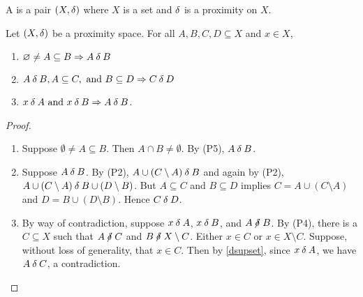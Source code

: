 \begin{definition}
	A  is a pair \( (X,\mathord{\delta}) \) where \( X \) is a set and \( \mathord{\delta} \) is a proximity on \( X \).
\end{definition}

\begin{proposition}
	\label{dprops}
	Let \( (X,\mathord{\delta}) \) be a proximity space.  For all \( A,B,C,D \subseteq X \) and \( x \in X \),
	\begin{enumerate}[label={(\arabic*)},ref={\theproposition(\arabic*)}]
		\item \label{dsubset}
			\( \varnothing \neq A \subseteq B \Rightarrow A \mathbin{\delta} B \)
		\item \label{dsupset}
			\( A \mathbin{\delta} B, A \subseteq C, \text{ and } B \subseteq D \Rightarrow C \mathbin{\delta} D \)
		\item \label{delement}
			\( x \mathbin{\delta} A \text{ and } x \mathbin{\delta} B \Rightarrow A \mathbin{\delta} B \).
	\end{enumerate}
\end{proposition}
\begin{proof}
	\leavevmode
	\begin{enumerate}
		\item
			Suppose \( \emptyset \neq A \subseteq B \).  Then \( A \cap B \neq \emptyset \).  By (P5), \( A \mathbin{\delta} B \).
		\item
			Suppose \( A \mathbin{\delta} B \).  By (P2), \( A \cup (C \setminus A) \mathbin{\delta} B \) and again by (P2), \( A \cup (C \setminus A) \mathbin{\delta} B \cup (D \setminus B) \).  But \( A \subseteq C \) and \( B \subseteq D \) implies \( C = A \cup (C \setminus A) \) and \( D = B \cup (D \setminus B) \).  Hence \( C \mathbin{\delta} D \).
		\item
			By way of contradiction, suppose \( x \mathbin{\delta} A \), \( x \mathbin{\delta} B \), and \( A \nnear B \).  By (P4), there is a \( C \subseteq X \) such that \( A \nnear C \) and \( B \nnear X \setminus C \).  Either \( x \in C \) or \( x \in X \setminus C \).  Suppose, without loss of generality, that \( x \in C \).  Then by \ref{dsupset}, since \( x \mathbin{\delta} A \), we have \( A \mathbin{\delta} C \), a contradiction.
	\end{enumerate}
\end{proof}

